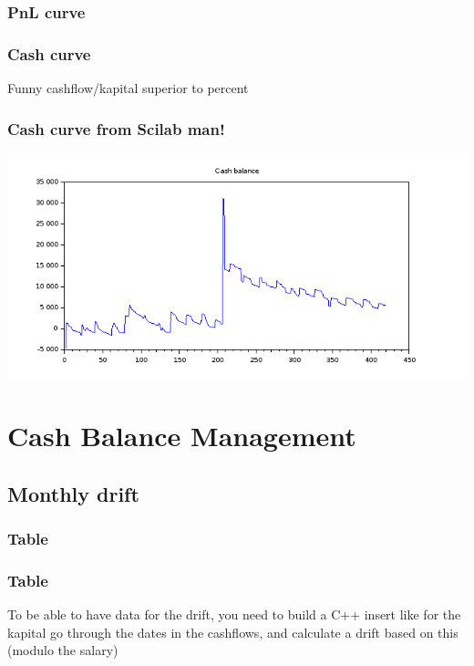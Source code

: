 \documentclass[8pt]{article} %
\begin{document}
\subsubsection{PnL curve}
%


\subsubsection{Cash curve}

Funny cashflow/kapital superior to percent\\



\subsubsection{Cash curve from Scilab man!}
\includegraphics[scale=0.6]{Scilab-cashBalance.png}

\section{Cash Balance Management}

\subsection{Monthly drift}

\subsubsection{Table}
%


\subsubsection{Table}

To be able to have data for the drift, you need to build a C++ insert like for the kapital
go through the dates in the cashflows, and calculate a drift based on this (modulo the salary) 
\end{document}
